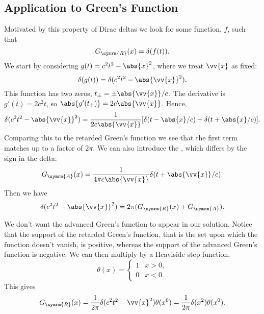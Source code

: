\documentclass[fleqn]{NotesClass}
\begin{document}
    \subsection{Application to Green's Function}
    Motivated by this property of Dirac deltas we look for some function, \(f\), such that
    \begin{equation}
        G_{\symrm{R}}(x) = \delta(f(t)).
    \end{equation}
    We start by considering \(g(t) = c^2t^2 - \abs{x}^2\), where we treat \(\vv{x}\) as fixed:
    \begin{equation}
        \delta(g(t)) = \delta(c^2 t^2 - \abs{\vv{x}}^2).
    \end{equation}
    This function has two zeros, \(t_{\pm} = \pm \abs{\vv{x}}/c\).
    The derivative is \(g'(t) = 2c^2t\), so \(\abs{g'(t_{\pm})} = 2c\abs{\vv{x}}\).
    Hence,
    \begin{equation}
        \delta(c^2t^2 - \abs{\vv{x}}^2) = \frac{1}{2c\abs{\vv{x}}} [\delta(t - \abs{x}/c) + \delta(t + \abs{x}/c)].
    \end{equation}
    Comparing this to the retarded Green's function we see that the first term matches up to a factor of \(2\pi\).
    We can also introduce the , which differs by the sign in the delta:
    \begin{equation}
        G_{\symrm{A}}(x) = \frac{1}{4\pi c\abs{\vv{x}}} \delta(t + \abs{\vv{x}}/c).
    \end{equation}
    Then we have
    \begin{equation}
        \delta(c^2 t^2 - \abs{\vv{x}}^2) = 2\pi (G_{\symrm{R}}(x) + G_{\symrm{A}}).
    \end{equation}
    
    We don't want the advanced Green's function to appear in our solution.
    Notice that the support of the retarded Green's function, that is the set upon which the function doesn't vanish, is positive, whereas the support of the advanced Green's function is negative.
    We can then multiply by a Heaviside step function,
    \begin{equation}
        \theta(x) = 
        \begin{cases}
            1 & x > 0,\\
            0 & x < 0.
        \end{cases}
    \end{equation}
    This gives
    \begin{equation}
        G_{\symrm{R}}(x) = \frac{1}{2\pi} \delta(c^2t^2 - \vv{x}^2) \theta(x^0) = \frac{1}{2\pi} \delta(x^2) \theta(x^0).
    \end{equation}
    
\end{document}
